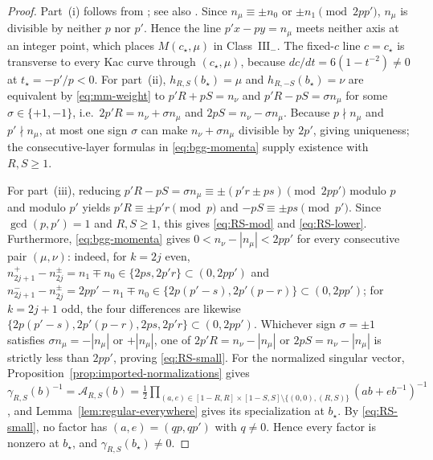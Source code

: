 \documentclass[twoside,10pt]{article}
\numberwithin{equation}{section}
\theoremstyle{slbody}
\theoremstyle{definition}
\theoremstyle{remark}
\begin{document}
\begin{proof}
Part~(i) follows from \cite[Theorem~A(a),(b)(iii),(c) and
Theorem~B(e)]{Astashkevich1997}; see also \cite[Proposition~5.4, Figure~5.4,
and Theorem~6.3]{IoharaKoga2011}.  Since \(n_\mu\equiv\pm n_0\) or
\(\pm n_1\pmod{2pp'}\), \(n_\mu\) is divisible by neither \(p\) nor \(p'\).
Hence the line \(p'x-py=n_\mu\) meets neither axis at an integer point, which
places \(M(c_\star,\mu)\) in Class~\(\mathrm{III}_-\).  The fixed-\(c\) line
\(c=c_\star\) is transverse to every Kac curve through \((c_\star,\mu)\),
because \(dc/dt=6(1-t^{-2})\neq0\) at \(t_\star=-p'/p<0\).
For part~(ii), \(h_{R,S}(b_\star)=\mu\) and \(h_{R,-S}(b_\star)=\nu\) are
equivalent by \eqref{eq:mm-weight} to \(p'R+pS=n_\nu\) and
\(p'R-pS=\sigma n_\mu\) for some \(\sigma\in\{+1,-1\}\), i.e.\
\(2p'R=n_\nu+\sigma n_\mu\) and \(2pS=n_\nu-\sigma n_\mu\).  Because
\(p\nmid n_\mu\) and \(p'\nmid n_\mu\), at most one sign \(\sigma\) can make
\(n_\nu+\sigma n_\mu\) divisible by \(2p'\), giving uniqueness; the
consecutive-layer formulas in \eqref{eq:bgg-momenta} supply existence with
\(R,S\geq1\).

For part~(iii), reducing \(p'R-pS=\sigma n_\mu\equiv\pm(p'r\pm ps)\pmod{2pp'}\)
modulo \(p\) and modulo \(p'\) yields \(p'R\equiv\pm p'r\pmod p\) and
\(-pS\equiv\pm ps\pmod{p'}\).  Since \(\gcd(p,p')=1\) and \(R,S\geq1\), this
gives \eqref{eq:RS-mod} and \eqref{eq:RS-lower}.  Furthermore,
\eqref{eq:bgg-momenta} gives \(0<n_\nu-|n_\mu|<2pp'\) for every consecutive
pair \((\mu,\nu)\): indeed, for \(k=2j\) even,
\(n^+_{2j+1}-n^\pm_{2j}=n_1\mp n_0\in\{2ps,2p'r\}\subset(0,2pp')\) and
\(n^-_{2j+1}-n^\pm_{2j}=2pp'-n_1\mp n_0\in\{2p(p'-s),2p'(p-r)\}\subset(0,2pp')\);
for \(k=2j+1\) odd, the four differences are likewise
\(\{2p(p'-s),2p'(p-r),2ps,2p'r\}\subset(0,2pp')\).  Whichever sign
\(\sigma=\pm1\) satisfies \(\sigma n_\mu=-|n_\mu|\) or \(+|n_\mu|\), one of
\(2p'R=n_\nu-|n_\mu|\) or \(2pS=n_\nu-|n_\mu|\) is strictly less than \(2pp'\),
proving \eqref{eq:RS-small}.  For the normalized singular vector, Proposition~\ref{prop:imported-normalizations}
gives
\(\gamma_{R,S}(b)^{-1}=\mathcal{A}_{R,S}(b)
=\frac{1}{2}\prod_{(a,e)\in[1-R,R]\times[1-S,S]\setminus\{(0,0),(R,S)\}}(ab+eb^{-1})^{-1}\),
and Lemma~\ref{lem:regular-everywhere} gives its specialization at
\(b_\star\).  By \eqref{eq:RS-small}, no factor has
\((a,e)=(qp,qp')\) with \(q\neq0\).  Hence every factor is nonzero at
\(b_\star\), and \(\gamma_{R,S}(b_\star)\neq0\).


\end{proof}
\end{document}
